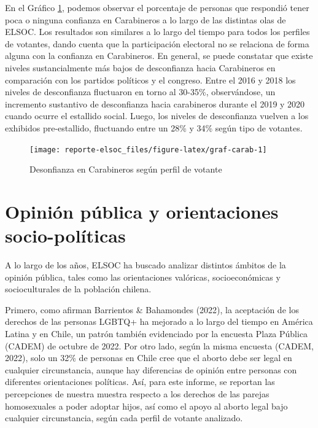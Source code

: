 \documentclass[
  12pt,
]{book}
\begin{document}
En el Gráfico \ref{fig:graf-carab}, podemos observar el porcentaje de personas que respondió tener poca o ninguna confianza en Carabineros a lo largo de las distintas olas de ELSOC. Los resultados son similares a lo largo del tiempo para todos los perfiles de votantes, dando cuenta que la participación electoral no se relaciona de forma alguna con la confianza en Carabineros. En general, se puede constatar que existe niveles sustancialmente más bajos de desconfianza hacia Carabineros en comparación con los partidos políticos y el congreso. Entre el 2016 y 2018 los niveles de desconfianza fluctuaron en torno al 30-35\%, observándose, un incremento sustantivo de desconfianza hacia carabineros durante el 2019 y 2020 cuando ocurre el estallido social. Luego, los niveles de desconfianza vuelven a los exhibidos pre-estallido, fluctuando entre un 28\% y 34\% según tipo de votantes.

\begin{figure}

{\centering \texttt{[image: reporte-elsoc\_files/figure-latex/graf-carab-1]} 

}

\caption{Desonfianza en Carabineros según perfil de votante}\label{fig:graf-carab}
\end{figure}

\hypertarget{opiniuxf3n-puxfablica-y-orientaciones-socio-poluxedticas}{%
\section{Opinión pública y orientaciones socio-políticas}\label{opiniuxf3n-puxfablica-y-orientaciones-socio-poluxedticas}}

A lo largo de los años, ELSOC ha buscado analizar distintos ámbitos de la opinión pública, tales como las orientaciones valóricas, socioeconómicas y socioculturales de la población chilena.

Primero, como afirman Barrientos \& Bahamondes (2022), la aceptación de los derechos de las personas LGBTQ+ ha mejorado a lo largo del tiempo en América Latina y en Chile, un patrón también evidenciado por la encuesta Plaza Pública (CADEM) de octubre de 2022. Por otro lado, según la misma encuesta (CADEM, 2022), solo un 32\% de personas en Chile cree que el aborto debe ser legal en cualquier circunstancia, aunque hay diferencias de opinión entre personas con diferentes orientaciones políticas. Así, para este informe, se reportan las percepciones de nuestra muestra respecto a los derechos de las parejas homosexuales a poder adoptar hijos, así como el apoyo al aborto legal bajo cualquier circunstancia, según cada perfil de votante analizado.
\end{document}

